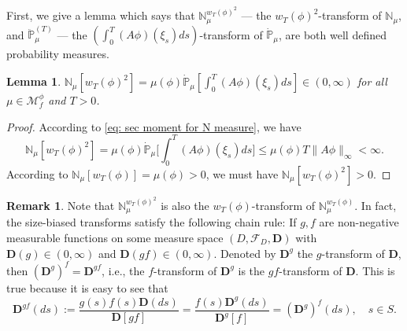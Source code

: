 \documentclass[UTF8]{pkuthss}
\theoremstyle{plain}
\newtheorem{lem}[thm]{Lemma}
\theoremstyle{definition}
\newtheorem{rem}[thm]{Remark}
\numberwithin{equation}{section}
\begin{document}
	First, we give a lemma which says that $\mathbb N_\mu^{w_T(\phi)^2}$ --- the $w_T(\phi)^2$-transform of $\mathbb N_\mu$, and $\ddot{\mathbb P}^{(T)}_\mu$ --- the $(\int_0^T (A\phi)(\xi_s) ds)$-transform of $\dot{\mathbb P}_{\mu}$, are both well defined probability measures.
\begin{lem}
	$\mathbb N_\mu[w_T(\phi)^2]
	= \mu(\phi) \dot{\mathbb P}_{\mu} [ \int_0^T (A\phi)(\xi_s) ds]\in (0,\infty)$ for all $\mu \in \mathcal M_f^\phi$ and $T>0$.
\end{lem}
\begin{proof}
	According to \eqref{eq: sec moment for N measure}, we have
\begin{equation}
	\mathbb N_\mu[w_T(\phi)^2 ]
	= \mu(\phi) \dot{\mathbb P}_\mu \Big[ \int_0^T( A \phi)(\xi_s)ds \Big] \leq \mu(\phi) T \|A\phi\|_\infty <  \infty.
\end{equation}
	According to $\mathbb N_\mu[w_T(\phi)] = \mu(\phi) > 0$, we must have $\mathbb N_\mu[w_T(\phi)^2 ] > 0$.
\end{proof}
\begin{rem}\label{rem:chain-rule}
	Note that $\mathbb N^{w_T(\phi)^2}_\mu$ is also the $w_T(\phi)$-transform of $\mathbb N^{w_T(\phi)}_\mu$.
	In fact, the size-biased transforms satisfy the following chain rule:
	If $g,f$ are non-negative measurable functions on some measure space $(D,\mathscr F_D,\mathbf D)$ with $\mathbf D(g) \in (0,\infty)$ and $\mathbf D(gf) \in (0,\infty)$.
	Denoted by $\mathbf D^g$ the $g$-transform of $\mathbf D$, then $(\mathbf D^g)^f = \mathbf D^{gf}$, i.e., the $f$-transform of $\mathbf D^g$ is the $gf$-transform of $\mathbf D$.
	This is true because it is easy to see that
\[
	\mathbf D^{gf}(ds)
	:= \frac{g(s) f(s) \mathbf D(ds)}{\mathbf D[gf]}
	= \frac{f(s) \mathbf D^g(ds)}{\mathbf D^g[f]}
    = (\mathbf D^g)^f (ds),
	\quad s\in S.
\]
\end{rem}
\end{document}

